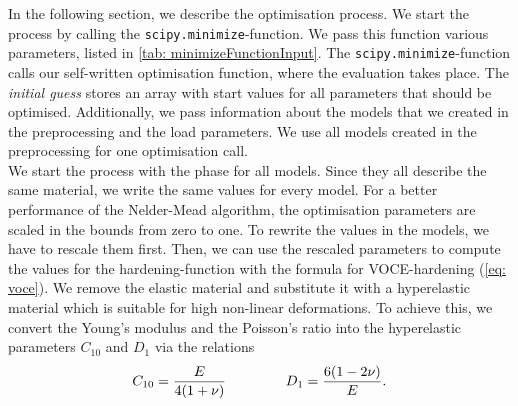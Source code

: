 In the following section, we describe the optimisation process. We start the process by calling the \verb|scipy.minimize|-function. We pass this function various parameters, listed in \autoref{tab: minimizeFunctionInput}. The \verb|scipy.minimize|-function calls our self-written optimisation function, where the evaluation takes place. The \emph{initial guess} stores an array with start values for all parameters that should be optimised. Additionally, we pass information about the models that we created in the preprocessing and the load parameters. We use all models created in the preprocessing for one optimisation call. \\
\indent We start the process with the phase  for all models.
Since they all describe the same material, we write the same values for every model.
For a better performance of the Nelder-Mead algorithm, the optimisation parameters are scaled in the bounds from zero to one.
To rewrite the values in the models, we have to rescale them first.
Then, we can use the rescaled parameters to compute the values for the hardening-function with the formula for VOCE-hardening (\autoref{eq: voce}).
We remove the elastic material and substitute it with a hyperelastic material which is suitable for high non-linear deformations.
To achieve this, we convert the Young's modulus and the Poisson's ratio into the hyperelastic parameters $C_{10}$ and $D_1$ via the relations
\begin{gather}\label{eq: elasticParams}
    C_{10} = \frac{E}{4(1+ \nu)} \hspace{1.5cm}
    D_1 = \frac{6(1-2\nu)}{E}.
\end{gather}

